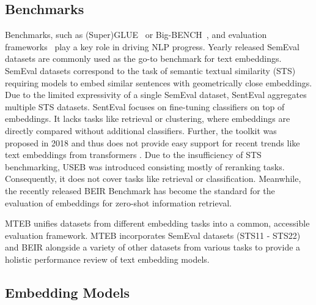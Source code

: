 \documentclass[11pt]{article}
\begin{document}
\subsection{Benchmarks}

Benchmarks, such as (Super)GLUE~\cite{wang2018glue,wang2019superglue} or Big-BENCH~\cite{srivastava2022beyond}, and evaluation frameworks~\cite{gao2021framework} play a key role in driving NLP progress. Yearly released SemEval datasets \cite{agirre2012semeval, agirre2013sem, agirre2014semeval, agirre2015semeval, agirre2016semeval} are commonly used as the go-to benchmark for text embeddings. SemEval datasets correspond to the task of semantic textual similarity (STS) requiring models to embed similar sentences with geometrically close embeddings. Due to the limited expressivity of a single SemEval dataset, SentEval \cite{conneau2018senteval} aggregates multiple STS datasets. SentEval focuses on fine-tuning classifiers on top of embeddings. It lacks tasks like retrieval or clustering, where embeddings are directly compared without additional classifiers. Further, the toolkit was proposed in 2018 and thus does not provide easy support for recent trends like text embeddings from transformers \cite{reimers2019sentence}. Due to the insufficiency of STS benchmarking, USEB \cite{wang2021tsdae} was introduced consisting mostly of reranking tasks. Consequently, it does not cover tasks like retrieval or classification. Meanwhile, the recently released BEIR Benchmark \cite{beir} has become the standard for the evaluation of embeddings for zero-shot information retrieval.

MTEB unifies datasets from different embedding tasks into a common, accessible evaluation framework. MTEB incorporates SemEval datasets (STS11 - STS22) and BEIR alongside a variety of other datasets from various tasks to provide a holistic performance review of text embedding models.

\subsection{Embedding Models}
\end{document}
